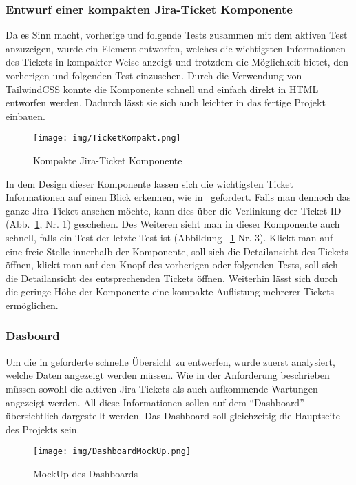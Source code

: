 \subsubsection{Entwurf einer kompakten Jira-Ticket Komponente}\label{sec:jirakompakt}
Da es Sinn macht, vorherige und folgende Tests zusammen mit dem aktiven Test 
anzuzeigen, wurde ein Element entworfen, welches die wichtigsten Informationen 
des Tickets in kompakter Weise anzeigt und trotzdem die Möglichkeit bietet, den 
vorherigen und folgenden Test einzusehen.
Durch die Verwendung von TailwindCSS konnte die Komponente schnell und einfach 
direkt in \gls{HTML} entworfen werden. Dadurch lässt sie sich auch leichter in
das fertige Projekt einbauen.

\begin{figure}[H]
    \texttt{[image: img/TicketKompakt.png]}
    \caption{Kompakte Jira-Ticket Komponente}\label{fig:ticketcompact}
\end{figure}

In dem Design dieser Komponente lassen sich die wichtigsten Ticket Informationen
auf einen Blick erkennen, wie in~ gefordert. 
Falls man dennoch das ganze Jira-Ticket ansehen möchte,
kann dies über die Verlinkung der Ticket-ID (Abb.~\ref{fig:ticketcompact}, Nr. 1) geschehen. Des Weiteren sieht man in 
dieser Komponente auch schnell, falls ein Test der letzte Test ist (Abbildung
~\ref{fig:ticketcompact} Nr. 3). Klickt man auf eine freie Stelle innerhalb
der Komponente, soll sich die Detailansicht des Tickets öffnen, klickt man auf 
den Knopf des vorherigen oder folgenden Tests, soll sich die Detailansicht des 
entsprechenden Tickets öffnen. Weiterhin lässt sich durch die geringe Höhe der 
Komponente eine kompakte Auflistung mehrerer Tickets ermöglichen.

\subsubsection{Dasboard}
Um die in  geforderte schnelle Übersicht zu entwerfen, 
wurde zuerst analysiert, welche Daten angezeigt werden müssen. Wie in der 
Anforderung  beschrieben müssen sowohl die aktiven Jira-Tickets als auch 
aufkommende Wartungen angezeigt werden. All diese Informationen sollen auf dem 
``Dashboard'' übersichtlich dargestellt werden. Das Dashboard soll gleichzeitig
die Hauptseite des Projekts sein.

\begin{figure}[H]
    \texttt{[image: img/DashboardMockUp.png]}
    \caption{MockUp des Dashboards}\label{fig:dashboard}
\end{figure}

